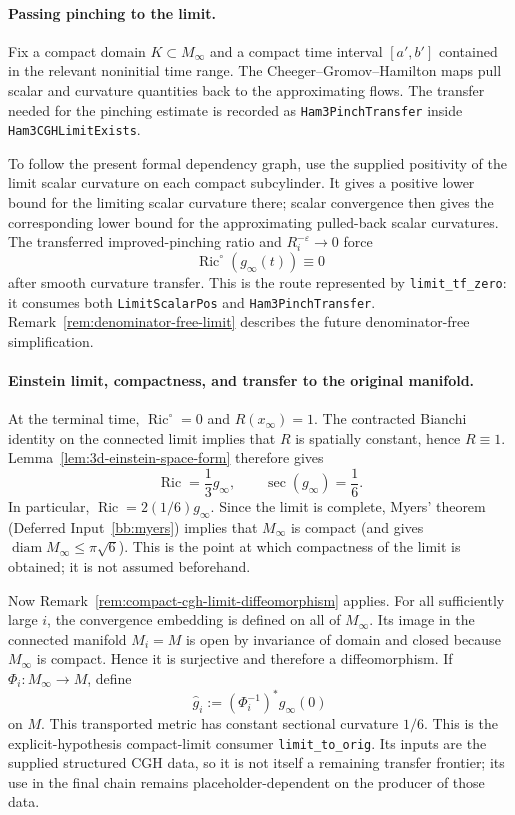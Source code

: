 \documentclass[11pt]{article}
\theoremstyle{plain}
\theoremstyle{definition}
\theoremstyle{remark}
\newcommand{\Ric}{\operatorname{Ric}}
\newcommand{\diam}{\operatorname{diam}}
\newcommand{\eps}{\varepsilon}
\newcommand{\leanref}[1]{\nolinkurl{#1}}
\begin{document}
\paragraph{Passing pinching to the limit.}
Fix a compact domain \(K\subset M_\infty\) and a compact time interval
\([a',b']\) contained in the relevant noninitial time range.  The
Cheeger--Gromov--Hamilton maps pull scalar and curvature quantities back to the
approximating flows.  The transfer needed for the pinching estimate is recorded
as \leanref{Ham3PinchTransfer} inside \leanref{Ham3CGHLimitExists}.

To follow the present formal dependency graph, use the supplied positivity of
the limit scalar curvature on each compact subcylinder.  It gives a positive
lower bound for the limiting scalar curvature there; scalar convergence then
gives the corresponding lower bound for the approximating pulled-back scalar
curvatures.  The transferred improved-pinching ratio and
$R_i^{-\eps}\to0$ force
\[
\Ric^\circ(g_\infty(t))\equiv0
\]
after smooth curvature transfer.  This is the route represented by
\leanref{limit_tf_zero}: it consumes both \leanref{LimitScalarPos} and
\leanref{Ham3PinchTransfer}.  Remark~\ref{rem:denominator-free-limit} describes
the future denominator-free simplification.

\paragraph{Einstein limit, compactness, and transfer to the original manifold.}
At the terminal time, $\Ric^\circ=0$ and
$R(x_\infty)=1$.  The contracted Bianchi identity on the connected limit
implies that $R$ is spatially constant, hence $R\equiv1$.
Lemma~\ref{lem:3d-einstein-space-form} therefore gives
\[
  \Ric=\frac13g_\infty,
  \qquad
  \sec(g_\infty)=\frac16.
\]
In particular, \(\Ric=2(1/6)g_\infty\).  Since the limit is complete, Myers'
theorem (Deferred Input~\ref{bb:myers}) implies that $M_\infty$ is compact (and gives
$\diam M_\infty\le\pi\sqrt6$).  This is the point at which
compactness of the limit is obtained; it is not assumed beforehand.

Now Remark~\ref{rem:compact-cgh-limit-diffeomorphism} applies.  For all
sufficiently large $i$, the convergence embedding is defined on all of
$M_\infty$.  Its image in the connected manifold $M_i=M$ is open by
invariance of domain and closed because $M_\infty$ is compact.  Hence it is
surjective and therefore a diffeomorphism.  If
$\Phi_i:M_\infty\to M$, define
\[
  \widehat g_i:=(\Phi_i^{-1})^*g_\infty(0)
\]
on $M$.  This transported metric has constant sectional curvature $1/6$.
This is the explicit-hypothesis compact-limit consumer
\leanref{limit_to_orig}.  Its inputs are the supplied structured CGH
data, so it is not itself a remaining transfer frontier; its use in the final
chain remains placeholder-dependent on the producer of those data.
\end{document}
